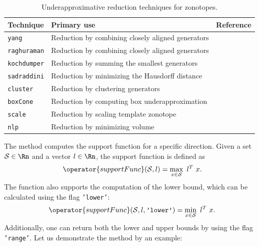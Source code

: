 \begin{center}
	\begin{minipage}[t]{0.42\textwidth}
		\vspace{10pt}
		\footnotesize
		
	\end{minipage}
	\begin{minipage}[t]{0.55\textwidth}
		\vspace{0pt}
		\centering
	\end{minipage}
\end{center}


\begin{table}[h]
	\caption{Underapproximative reduction techniques for zonotopes.}
	\centering
	\label{tab:zono_reductionUnder}
	\begin{tabular}{lll}
		\toprule
		\textbf{Technique} & \textbf{Primary use} & \textbf{Reference} \\
		\midrule
		\texttt{yang} & Reduction by combining closely aligned generators & \cite[Sec.~IV.B]{Yang2022} \\
		\texttt{raghuraman} & Reduction by combining closely aligned generators & \cite[Sec.~5.1]{Raghuraman2022} \\
		\texttt{kochdumper} & Reduction by summing the smallest generators & \cite[Prop. ~.1]{Kochdumper2022a} \\
		\texttt{sadraddini} & Reduction by minimizing the Hausdorff distance & \cite[Corollary.~6 in arXiv version]{Sadraddini2019} \\
		\texttt{cluster} & Reduction by clustering generators & \cite[Sec.~IV.A]{Luetzow2025c} \\
		\texttt{boxCone} & Reduction by computing box underapproximation & \cite[Sec.~IV.B]{Luetzow2025c} \\
		\texttt{scale} & Reduction by scaling template zonotope & \cite[Sec.~IV.C]{Luetzow2025c} \\
		\texttt{nlp} & Reduction by minimizing volume & \cite[Sec.~IV.D]{Luetzow2025c} \\
		\bottomrule
	\end{tabular}
\end{table}



The method  computes the support function for a specific direction. Given a set $\mathcal{S} \in \Rn$ and a vector $l \in \Rn$, the support function is defined as
\begin{equation*}
	\operator{supportFunc}(\mathcal{S},l) = \max_{x \in \mathcal{S}} ~l^T~x.
\end{equation*}
The function also supports the computation of the lower bound, which can be calculated using the flag \texttt{'lower'}:
\begin{equation*}
	\operator{supportFunc}(\mathcal{S},l,\texttt{'lower'}) = \min_{x \in \mathcal{S}} ~l^T~x.
\end{equation*}
Additionally, one can return both the lower and upper bounds by using the flag \texttt{'range'}.
Let us demonstrate the method  by an example:

